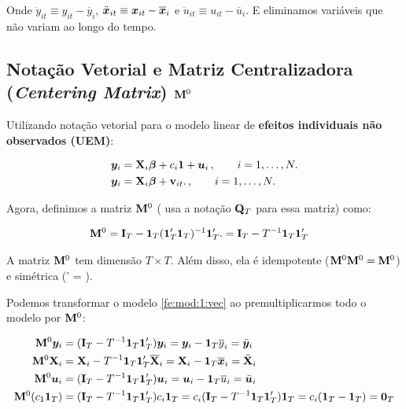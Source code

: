 \documentclass[11pt, oneside, a4paper, article]{article}
\numberwithin{equation}{section}
\begin{document}
\noindent
Onde 
$\ddot{y}_{it} \equiv y_{it} - \overline{y}_{i}$, 
$\ddot{\boldsymbol{x}}_{it} \equiv \boldsymbol{x}_{it} - \overline{\boldsymbol{x}}_{i}$ e
$\ddot{u}_{it} \equiv u_{it} - \overline{u}_{i}$.
E eliminamos variáveis que não variam ao longo do tempo.

\subsection{Notação Vetorial e Matriz Centralizadora (\textit{Centering Matrix}) $\mathbf{M}^{0}$}

Utilizando notação vetorial para o modelo linear de \textbf{efeitos individuais não observados (UEM)}:

\vspace{-1 em}
\begin{align} \label{fe:mod:1:vec}
\boldsymbol{y}_{i} &= \mathbf{X}_{i} \boldsymbol{\beta} + c_{i} \boldsymbol{1} + \boldsymbol{u}_{i} 
\, , \qquad	i = 1, \dots, N.
\\
\label{fe:mod:2:vec}
\boldsymbol{y}_{i} &= \mathbf{X}_{i} \boldsymbol{\beta} + \mathbf{v}_{it}.
\, , \qquad	i = 1, \dots, N.
\end{align}

\noindent
Agora, definimos a matriz $\mathbf{M}^{0}$ (\citet[p. 268]{wool-2010} usa a notação $\mathbf{Q}_{T}$ para essa matriz) como:

\vspace{-1 em}
\begin{align*}
	\mathbf{M}^{0} &=
	\mathbf{I}_{T} - \boldsymbol{1}_{T} (\boldsymbol{1}_{T}' \boldsymbol{1}_{T})^{-1} \boldsymbol{1}_{T}'.
	=
	\mathbf{I}_{T} - T^{-1} \boldsymbol{1}_{T} \boldsymbol{1}_{T}'
\end{align*}

\noindent
A matriz $\mathbf{M}^{0}$ tem dimensão $T \times T$.
Além disso, ela é idempotente ($\mathbf{M}^{0} \mathbf{M}^{0} = \mathbf{M}^{0}$) e simétrica (\Mzero' = \Mzero).

\vspace{1 em}
Podemos transformar o modelo \eqref{fe:mod:1:vec} ao premultiplicarmos todo o modelo por $\mathbf{M}^{0}$:

\vspace{-1 em}
\begin{align*} 
\mathbf{M}^{0} \boldsymbol{y}_{i} &= ( \mathbf{I}_{T} - T^{-1} \boldsymbol{1}_{T} \boldsymbol{1}_{T}')\boldsymbol{y}_{i}	= \boldsymbol{y}_{i} - \boldsymbol{1}_{T} \overline{y}_{i} = \ddot{\boldsymbol{y}}_{i}
\\
\mathbf{M}^{0} \mathbf{X}_{i} &=
\mathbf{X}_{i} - T^{-1} \boldsymbol{1}_{T} \boldsymbol{1}_{T}' \overline{\mathbf{X}}_{i} =
\mathbf{X}_{i} - \boldsymbol{1}_{T} \overline{\boldsymbol{x}}_{i} =
\ddot{\mathbf{X}}_{i}
\\
\mathbf{M}^{0} \boldsymbol{u}_{i} &= ( \mathbf{I}_{T} - T^{-1} \boldsymbol{1}_{T} \boldsymbol{1}_{T}')\boldsymbol{u}_{i}	= \boldsymbol{u}_{i} - \boldsymbol{1}_{T} \overline{u}_{i} = \ddot{\boldsymbol{u}}_{i}
\\
\mathbf{M}^{0} ( c_{1} \boldsymbol{1}_{T} ) &= 
( \mathbf{I}_{T} - T^{-1} \boldsymbol{1}_{T} \boldsymbol{1}_{T}' ) c_{i} \boldsymbol{1}_{T} =
c_{i}( \mathbf{I}_{T} - T^{-1} \boldsymbol{1}_{T} \boldsymbol{1}_{T}' ) \boldsymbol{1}_{T} =
c_{i}( \boldsymbol{1}_{T} - \boldsymbol{1}_{T} ) = \boldsymbol{0}_{T}
\end{align*}
\end{document}
